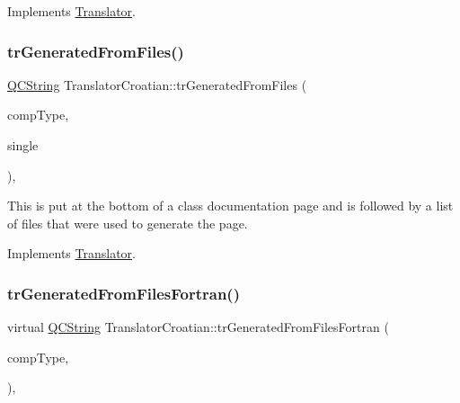 Implements \mbox{\hyperlink{class_translator}{Translator}}.

\mbox{\label{class_translator_croatian_aabb6a30ea2fe31507b1c55593e206681}} 
\subsubsection{\texorpdfstring{trGeneratedFromFiles()}{trGeneratedFromFiles()}}
{\footnotesize\ttfamily \mbox{\hyperlink{class_q_c_string}{Q\+C\+String}} Translator\+Croatian\+::tr\+Generated\+From\+Files (\begin{DoxyParamCaption}\item[{\mbox{\hyperlink{class_class_def_ae70cf86d35fe954a94c566fbcfc87939}{Class\+Def\+::\+Compound\+Type}}}]{comp\+Type,  }\item[{bool}]{single }\end{DoxyParamCaption})\hspace{0.3cm}{\ttfamily [inline]}, {\ttfamily [virtual]}}

This is put at the bottom of a class documentation page and is followed by a list of files that were used to generate the page. 

Implements \mbox{\hyperlink{class_translator}{Translator}}.

\mbox{\label{class_translator_croatian_afd13c496f152991572102637abdd0a66}} 
\subsubsection{\texorpdfstring{trGeneratedFromFilesFortran()}{trGeneratedFromFilesFortran()}}
{\footnotesize\ttfamily virtual \mbox{\hyperlink{class_q_c_string}{Q\+C\+String}} Translator\+Croatian\+::tr\+Generated\+From\+Files\+Fortran (\begin{DoxyParamCaption}\item[{\mbox{\hyperlink{class_class_def_ae70cf86d35fe954a94c566fbcfc87939}{Class\+Def\+::\+Compound\+Type}}}]{comp\+Type,  }\item[{bool}]{ }\end{DoxyParamCaption})\hspace{0.3cm}{\ttfamily [inline]}, {\ttfamily [virtual]}}

